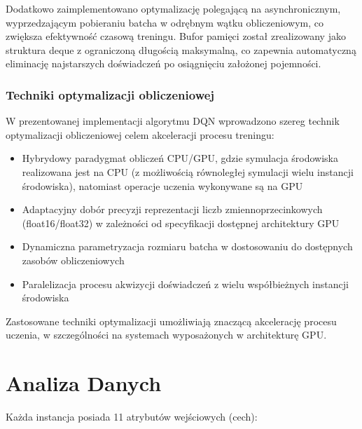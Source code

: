 \documentclass[a4paper,12pt]{article}
\begin{document}
Dodatkowo zaimplementowano optymalizację polegającą na asynchronicznym, wyprzedzającym pobieraniu batcha w odrębnym wątku obliczeniowym, co zwiększa efektywność czasową treningu. Bufor pamięci został zrealizowany jako struktura deque z ograniczoną długością maksymalną, co zapewnia automatyczną eliminację najstarszych doświadczeń po osiągnięciu założonej pojemności.
\clearpage
\subsubsection{Techniki optymalizacji obliczeniowej}

W prezentowanej implementacji algorytmu DQN wprowadzono szereg technik optymalizacji obliczeniowej celem akceleracji procesu treningu:
\begin{itemize}
\item Hybrydowy paradygmat obliczeń CPU/GPU, gdzie symulacja środowiska realizowana jest na CPU (z możliwością równoległej symulacji wielu instancji środowiska), natomiast operacje uczenia wykonywane są na GPU
\item Adaptacyjny dobór precyzji reprezentacji liczb zmiennoprzecinkowych (float16/float32) w zależności od specyfikacji dostępnej architektury GPU
\item Dynamiczna parametryzacja rozmiaru batcha w dostosowaniu do dostępnych zasobów obliczeniowych
\item Paralelizacja procesu akwizycji doświadczeń z wielu współbieżnych instancji środowiska
\end{itemize}

Zastosowane techniki optymalizacji umożliwiają znaczącą akcelerację procesu uczenia, w szczególności na systemach wyposażonych w architekturę GPU.
  \section{Analiza Danych}

Każda instancja posiada 11 atrybutów wejściowych (cech):
\end{document}
